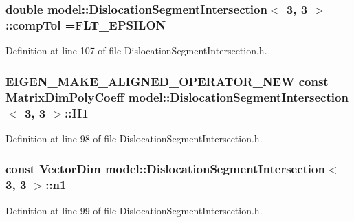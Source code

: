 \subsubsection[{comp\+Tol}]{\setlength{\rightskip}{0pt plus 5cm}double {\bf model\+::\+Dislocation\+Segment\+Intersection}$<$ 3, 3 $>$\+::comp\+Tol =F\+L\+T\+\_\+\+E\+P\+S\+I\+L\+O\+N\hspace{0.3cm}{\ttfamily [static]}}\label{classmodel_1_1_dislocation_segment_intersection_3_013_00_013_01_4_aa1721b1ea53709e6ff10c870ca859a93}


Definition at line 107 of file Dislocation\+Segment\+Intersection.\+h.

\hypertarget{classmodel_1_1_dislocation_segment_intersection_3_013_00_013_01_4_a901e0201aff4c24fe19a13cdd8c4bf1e}{}
\subsubsection[{H1}]{\setlength{\rightskip}{0pt plus 5cm}E\+I\+G\+E\+N\+\_\+\+M\+A\+K\+E\+\_\+\+A\+L\+I\+G\+N\+E\+D\+\_\+\+O\+P\+E\+R\+A\+T\+O\+R\+\_\+\+N\+E\+W const Matrix\+Dim\+Poly\+Coeff {\bf model\+::\+Dislocation\+Segment\+Intersection}$<$ 3, 3 $>$\+::H1}\label{classmodel_1_1_dislocation_segment_intersection_3_013_00_013_01_4_a901e0201aff4c24fe19a13cdd8c4bf1e}


Definition at line 98 of file Dislocation\+Segment\+Intersection.\+h.

\hypertarget{classmodel_1_1_dislocation_segment_intersection_3_013_00_013_01_4_a012b4e371bb7a9e67534af201d858411}{}
\subsubsection[{n1}]{\setlength{\rightskip}{0pt plus 5cm}const Vector\+Dim {\bf model\+::\+Dislocation\+Segment\+Intersection}$<$ 3, 3 $>$\+::n1}\label{classmodel_1_1_dislocation_segment_intersection_3_013_00_013_01_4_a012b4e371bb7a9e67534af201d858411}


Definition at line 99 of file Dislocation\+Segment\+Intersection.\+h.

